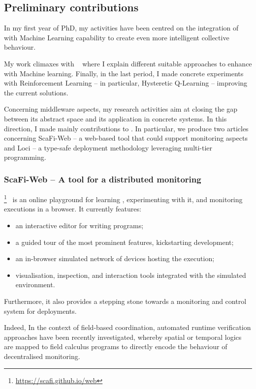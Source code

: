 \documentclass[11pt]{article}
\begin{document}
\subsection{Preliminary contributions}
In my first year of PhD, my activities have been centred on
the integration of \ac{} with Machine Learning capability to create even more
intelligent collective behaviour. 

My work climaxes with ~\cite{research} where I explain different suitable approaches to
enhance \ac{} with Machine learning. Finally, in the last period, I made concrete
experiments with Reinforcement Learning -- in particular, Hysteretic Q-Learning \cite{hysteretic-q} -- improving the current \ac{} solutions.

Concerning middleware aspects, my research activities aim at closing the gap between
its abstract space and its application in concrete systems. In this direction, I made mainly contributions to \scafi. In particular, we produce two articles concerning ScaFi-Web -- a web-based tool that could support monitoring aspects and \scafi Loci -- a type-safe deployment methodology leveraging multi-tier programming.
\subsubsection{ScaFi-Web -- A tool for a distributed monitoring}
\scafiweb{}\footnote{\url{https://scafi.github.io/web}}~\cite{DBLP:conf/coordination/AguzziCMPV21}
 is an online playground for learning \ac{}, experimenting with it, and monitoring executions in a browser.
It currently features:
\begin{itemize}
 \item an interactive editor for writing \scafi{} programs;
 \item a guided tour of the most prominent features, kickstarting development;
 \item an in-browser simulated network of devices hosting the execution;
 \item visualisation, inspection, and interaction tools integrated with the simulated environment.
\end{itemize}

Furthermore, it also provides a stepping stone towards a monitoring and control system for \ac{} deployments.

Indeed, In the context of field-based coordination, automated runtime verification approaches have been recently investigated, whereby spatial or temporal logics are mapped to field calculus programs to directly encode the behaviour of decentralised monitoring.
\end{document}
